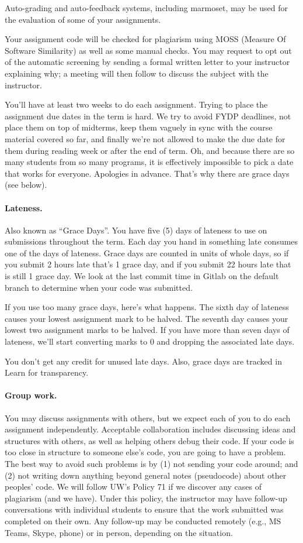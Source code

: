 Auto-grading and auto-feedback systems, including marmoset, may be used for the evaluation of some of your assignments.

Your assignment code will be checked for plagiarism using MOSS (Measure Of Software Similarity) as well as some manual checks. You may request to opt out of the automatic screening by sending a formal written letter to your instructor explaining why; a meeting will then follow to discuss the subject with the instructor. 

You'll have at least two weeks to do each assignment. Trying to place the assignment due dates in the term is hard. We try to avoid FYDP deadlines, not place them on top of midterms, keep them vaguely in sync with the course material covered so far, and finally we're not allowed to make the due date for them during reading week or after the end of term. Oh, and because there are so many students from so many programs, it is effectively impossible to pick a date that works for everyone. Apologies in advance. That's why there are grace days (see below).


\paragraph{Lateness.} Also known as ``Grace Days''. You have five (5) days of lateness to use on  submissions throughout the term. Each day you hand in something late consumes one of the days of lateness. Grace days are counted in units of whole days, so if you submit 2 hours late that's 1 grace day, and if you submit 22 hours late that is still 1 grace day. We look at the last commit time in Gitlab on the default branch to determine when your code was submitted.

If you use too many grace days, here's what happens. The sixth day of lateness causes your lowest assignment mark to be halved. The seventh day causes your lowest two assignment marks to be halved. If you have more than seven days of lateness, we'll start converting marks to 0 and dropping the associated late days.

You don't get any credit for unused late days. Also, grace days are tracked in Learn for transparency.

\paragraph{Group work.} 
You may discuss assignments with others, but we expect each of you to
do each assignment independently. Acceptable collaboration includes
discussing ideas and structures with others, as well as helping others
debug their code. If your code is too close in structure to someone
else's code, you are going to have a problem. The best way to avoid
such problems is by (1) not sending your code around; and (2) not
writing down anything beyond general notes (pseudocode) about other
peoples' code. We will follow UW's Policy 71 if we discover any cases of
plagiarism (and we have). Under this policy, the instructor may have follow-up conversations with individual students to ensure that the work submitted was completed on their own. Any follow-up may be conducted remotely (e.g., MS Teams, Skype, phone) or in person, depending on the situation.

